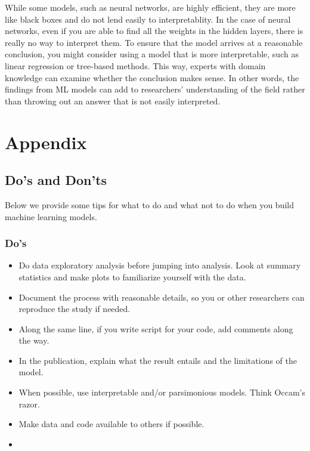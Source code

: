 \documentclass[
]{book}
\providecommand{\tightlist}{%
  \setlength{\itemsep}{0pt}\setlength{\parskip}{0pt}}
\begin{document}
While some models, such as neural networks, are highly efficient, they are more like black boxes and do not lend easily to interpretablity. In the case of neural networks, even if you are able to find all the weights in the hidden layers, there is really no way to interpret them. To ensure that the model arrives at a reasonable conclusion, you might consider using a model that is more interpretable, such as linear regression or tree-based methods. This way, experts with domain knowledge can examine whether the conclusion makes sense. In other words, the findings from ML models can add to researchers' understanding of the field rather than throwing out an answer that is not easily interpreted.

\hypertarget{appendix}{%
\chapter{Appendix}\label{appendix}}

\hypertarget{dos-and-donts}{%
\section{Do's and Don'ts}\label{dos-and-donts}}

Below we provide some tips for what to do and what not to do when you build machine learning models.

\hypertarget{dos}{%
\subsection{Do's}\label{dos}}

\begin{itemize}
\tightlist
\item
  Do data exploratory analysis before jumping into analysis. Look at summary statistics and make plots to familiarize yourself with the data.
\item
  Document the process with reasonable details, so you or other researchers can reproduce the study if needed.
\item
  Along the same line, if you write script for your code, add comments along the way.
\item
  In the publication, explain what the result entails and the limitations of the model.
\item
  When possible, use interpretable and/or parsimonious models. Think Occam's razor.
\item
  Make data and code available to others if possible.
\item
\end{itemize}
\end{document}
